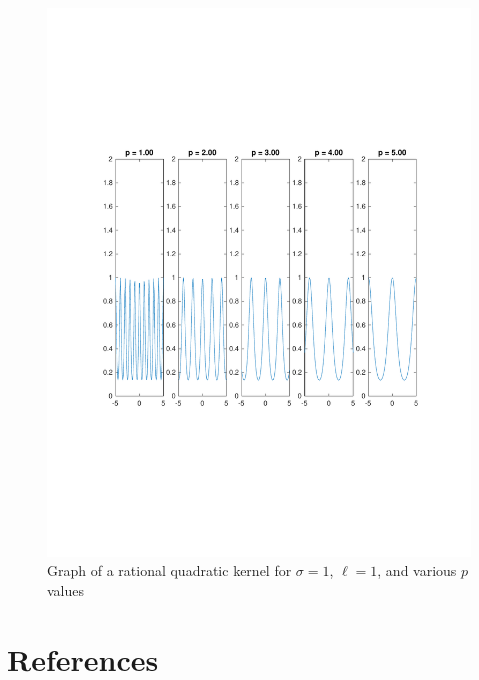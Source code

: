 \documentclass{article}
\begin{document}
\begin{figure}[H]
  \centering
  \caption{Graph of a rational quadratic kernel for $\sigma = 1$, $\ell = 1$, and various $p$ values}
  \label{fig:periodic_kernel}
  \includegraphics[trim={0 7cm 0 7cm},clip,keepaspectratio=true,scale=0.5]{periodic_kernel}
\end{figure}

\section{References}


\end{document}
